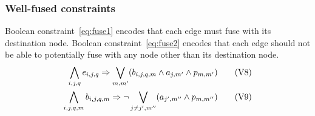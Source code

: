 \subsubsection{Well-fused constraints}
Boolean constraint~\eqref{eq:fuse1} encodes that each edge must fuse with
its destination node.
%
Boolean constraint~\eqref{eq:fuse2} encodes that each edge should not
be able to potentially fuse with any node other than its destination node.
\begin{align}
  \bigwedge\limits_{i,j,q} e_{i,j,q} \Rightarrow \bigvee_{m,m^{\prime}} (b_{i,j,q,m} \land a_{j,m^{\prime}} \land p_{m,m^{\prime}})
  \tag{V8}\label{eq:fuse1}  \\
\bigwedge\limits_{i,j,q,m} b_{i,j,q,m} \Rightarrow \neg \bigvee_{j \neq j^{\prime}, m^{\prime\prime}} ( a_{j^{\prime},m^{\prime\prime}} \land p_{m,m^{\prime\prime}})
  \tag{V9}\label{eq:fuse2}  
\end{align}







